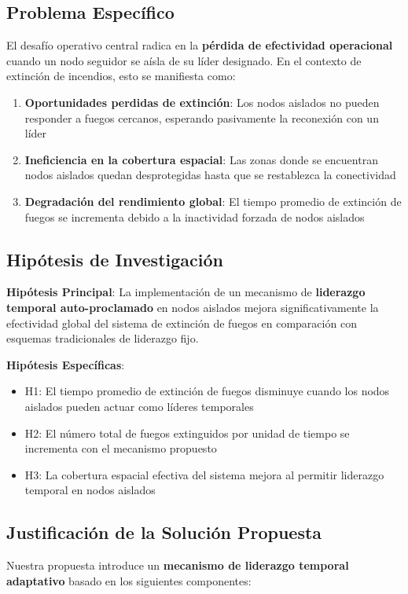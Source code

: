 \documentclass{article}
\begin{document}
\subsection{Problema Específico}
El desafío operativo central radica en la \textbf{pérdida de efectividad operacional} cuando un nodo seguidor se aísla de su líder designado. En el contexto de extinción de incendios, esto se manifiesta como:

\begin{enumerate}
    \item \textbf{Oportunidades perdidas de extinción}: Los nodos aislados no pueden responder a fuegos cercanos, esperando pasivamente la reconexión con un líder
    
    \item \textbf{Ineficiencia en la cobertura espacial}: Las zonas donde se encuentran nodos aislados quedan desprotegidas hasta que se restablezca la conectividad
    
    \item \textbf{Degradación del rendimiento global}: El tiempo promedio de extinción de fuegos se incrementa debido a la inactividad forzada de nodos aislados
\end{enumerate}

\subsection{Hipótesis de Investigación}
\textbf{Hipótesis Principal}: La implementación de un mecanismo de \textbf{liderazgo temporal auto-proclamado} en nodos aislados mejora significativamente la efectividad global del sistema de extinción de fuegos en comparación con esquemas tradicionales de liderazgo fijo.

\textbf{Hipótesis Específicas}:
\begin{itemize}
    \item H1: El tiempo promedio de extinción de fuegos disminuye cuando los nodos aislados pueden actuar como líderes temporales
    \item H2: El número total de fuegos extinguidos por unidad de tiempo se incrementa con el mecanismo propuesto
    \item H3: La cobertura espacial efectiva del sistema mejora al permitir liderazgo temporal en nodos aislados
\end{itemize}

\subsection{Justificación de la Solución Propuesta}
Nuestra propuesta introduce un \textbf{mecanismo de liderazgo temporal adaptativo} basado en los siguientes componentes:
\end{document}
